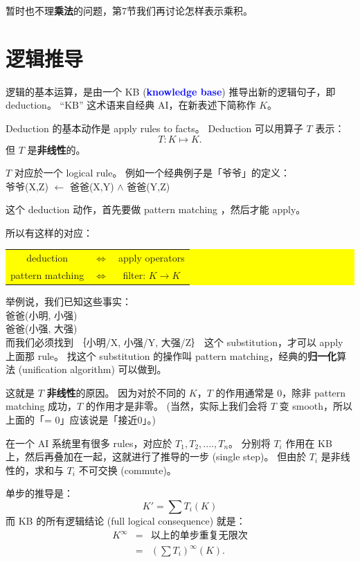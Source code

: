 \documentclass[12pt]{article}
\newcommand{\concept}[1]{\textbf{\textcolor{blue}{#1}}}
\newcommand{\formula}[1]{\textcolor{LogicColor}{#1}}
\newcommand{\tab}{\hspace*{1cm}}
\begin{document}
暂时也不理\textbf{乘法}的问题，第7节我们再讨论怎样表示乘积。

\section{逻辑推导}

逻辑的基本运算，是由一个 KB (\concept{knowledge base}) 推导出新的逻辑句子，即  deduction。 ``KB'' 这术语来自经典 AI，在新表述下简称作 $K$。

Deduction 的基本动作是 apply rules to facts。 Deduction 可以用算子 $T$ 表示：
$$ T: K \mapsto K .$$
但 $T$ 是\textbf{非线性}的。

$T$ 对应於一个 logical rule。  例如一个经典例子是「爷爷」的定义：\\
\tab \formula{ 爷爷(X,Z) $\leftarrow$ 爸爸(X,Y) $\wedge$ 爸爸(Y,Z)}

这个 deduction 动作，首先要做 pattern matching ，然后才能 apply。

所以有这样的对应：
\begin{center}
\colorbox{yellow}{\parbox{0.55\textwidth}{
\begin{tabular}{ccc}
deduction & $\Leftrightarrow$ & apply operators \\
pattern matching & $\Leftrightarrow$ & filter: $K \rightarrow K$ \\ 
\end{tabular}
}}
\end{center}

举例说，我们已知这些事实：\\
\tab \formula{爸爸(小明, 小强)} \\
\tab \formula{爸爸(小强, 大强)} \\
而我们必须找到 ｛小明/X, 小强/Y, 大强/Z｝ 这个 substitution，才可以 apply 上面那 rule。  找这个 substitution 的操作叫 pattern matching，经典的\textbf{归一化}算法 (unification algorithm) 可以做到。

这就是 $T$ \textbf{非线性}的原因。  因为对於不同的 $K$，$T$ 的作用通常是 0，除非 pattern matching 成功，$T$ 的作用才是非零。 (当然，实际上我们会将 $T$ 变 smooth，所以上面的「= 0」应该说是「接近0」。)

在一个 AI 系统里有很多 rules，对应於 $T_1, T_2, ...., T_n$。  分别将 $T_i$ 作用在 KB 上，然后再叠加在一起，这就进行了推导的一步 (single step)。  但由於 $T_i$ 是非线性的，求和与 $T_i$ 不可交换 (commute)。

单步的推导是：
     $$ K' = \sum T_i (K) $$
而 KB 的所有逻辑结论 (full logical consequence) 就是：
\begin{eqnarray} \nonumber
K^\infty & = & \mbox{以上的单步重复无限次} \\ \nonumber
         & = &  (\sum T_i) ^\infty (K) .
\end{eqnarray}
\end{document}

